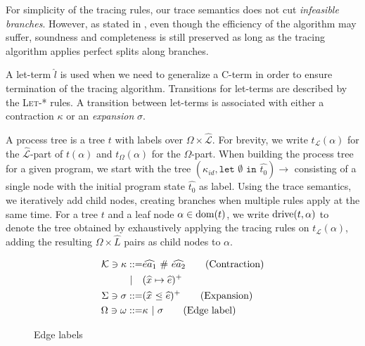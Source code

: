 \documentclass[10pt]{../sigplanconf}
\newcommand{\dom}{\ensuremath{{\rm dom}}}
\newcommand{\gen}{\ensuremath{~{\leq\kern-6pt \raisebox{1pt}{$\cdot$}}~}}
\begin{document}
For simplicity of the tracing rules, our trace semantics does not cut
\emph{infeasible branches}. However, as stated in
\cite{abramov2000universal}, even though the efficiency of the
algorithm may suffer, soundness and completeness is still preserved as
long as the tracing algorithm applies perfect splits along branches.

A let-term $\widehat{l}$ is used when we need to generalize a C-term
in order to ensure termination of the tracing algorithm. Transitions
for let-terms are described by the \textsc{Let-*} rules. A transition
between let-terms is associated with either a contraction $\kappa$ or
an \emph{expansion} $\sigma$.

A process tree is a tree $t$ with labels over $\Omega \times
\widehat{\mathcal{L}}$. For brevity, we write $t_\mathcal{L}(\alpha)$
for the $\widehat{\mathcal{L}}$-part of $t(\alpha)$ and
$t_\Omega(\alpha)$ for the $\Omega$-part. When building the process
tree for a given program, we start with the tree $(\kappa_{id},
\texttt{let $\emptyset$ in $\widehat{t_0}$}) \rightarrow$ consisting
of a single node with the initial program state $\widehat{t_0}$ as
label. Using the trace semantics, we iteratively add child nodes,
creating branches when multiple rules apply at the same time. For a
tree $t$ and a leaf node $\alpha \in \dom(t)$, we write ${\rm
  drive}(t, \alpha)$ to denote the tree obtained by exhaustively
applying the tracing rules on $t_\mathcal{L}(\alpha)$, adding the
resulting $\Omega \times \widehat{L}$ pairs as child nodes to
$\alpha$.

\begin{figure}
  \begin{align*}
    \mathcal{K} \ni \kappa ::= & \widehat{ea_1}~\#~\widehat{ea_2} \tag{Contraction} \\
                       | \quad & (\widehat{x} \mapsto \widehat{e})^{+} \\
    \Sigma \ni \sigma ::= & (\widehat{x} \gen \widehat{e})^{+} \tag{Expansion} \\
    \Omega \ni \omega ::= & \kappa ~|~ \sigma \tag{Edge label}
  \end{align*}
  \caption{Edge labels}
  \label{fig:edge}
\end{figure}
\end{document}
